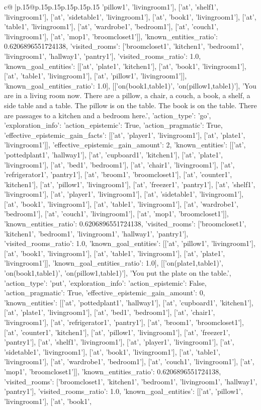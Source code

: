 \documentclass{article}
\begin{document}
{\begin{supertabular}{c@{$\;$}|p{.15\linewidth}@{}p{.15\linewidth}p{.15\linewidth}p{.15\linewidth}p{.15\linewidth}p{.15\linewidth}}
{{{'pillow1', 'livingroom1'], ['at', 'shelf1', 'livingroom1'], ['at', 'sidetable1', 'livingroom1'], ['at', 'book1', 'livingroom1'], ['at', 'table1', 'livingroom1'], ['at', 'wardrobe1', 'bedroom1'], ['at', 'couch1', 'livingroom1'], ['at', 'mop1', 'broomcloset1']], 'known_entities_ratio': 0.6206896551724138, 'visited_rooms': ['broomcloset1', 'kitchen1', 'bedroom1', 'livingroom1', 'hallway1', 'pantry1'], 'visited_rooms_ratio': 1.0, 'known_goal_entities': [['at', 'plate1', 'kitchen1'], ['at', 'book1', 'livingroom1'], ['at', 'table1', 'livingroom1'], ['at', 'pillow1', 'livingroom1']], 'known_goal_entities_ratio': 1.0}}], [['on(book1,table1)', 'on(pillow1,table1)'], 'You are in a living room now. There are a pillow, a chair, a couch, a book, a shelf, a side table and a table. The pillow is on the table. The book is on the table. There are passages to a kitchen and a bedroom here.', {'action_type': 'go', 'exploration_info': {'action_epistemic': True, 'action_pragmatic': True, 'effective_epistemic_gain_facts': [['at', 'player1', 'livingroom1'], ['at', 'plate1', 'livingroom1']], 'effective_epistemic_gain_amount': 2, 'known_entities': [['at', 'pottedplant1', 'hallway1'], ['at', 'cupboard1', 'kitchen1'], ['at', 'plate1', 'livingroom1'], ['at', 'bed1', 'bedroom1'], ['at', 'chair1', 'livingroom1'], ['at', 'refrigerator1', 'pantry1'], ['at', 'broom1', 'broomcloset1'], ['at', 'counter1', 'kitchen1'], ['at', 'pillow1', 'livingroom1'], ['at', 'freezer1', 'pantry1'], ['at', 'shelf1', 'livingroom1'], ['at', 'player1', 'livingroom1'], ['at', 'sidetable1', 'livingroom1'], ['at', 'book1', 'livingroom1'], ['at', 'table1', 'livingroom1'], ['at', 'wardrobe1', 'bedroom1'], ['at', 'couch1', 'livingroom1'], ['at', 'mop1', 'broomcloset1']], 'known_entities_ratio': 0.6206896551724138, 'visited_rooms': ['broomcloset1', 'kitchen1', 'bedroom1', 'livingroom1', 'hallway1', 'pantry1'], 'visited_rooms_ratio': 1.0, 'known_goal_entities': [['at', 'pillow1', 'livingroom1'], ['at', 'book1', 'livingroom1'], ['at', 'table1', 'livingroom1'], ['at', 'plate1', 'livingroom1']], 'known_goal_entities_ratio': 1.0}}], [['on(plate1,table1)', 'on(book1,table1)', 'on(pillow1,table1)'], 'You put the plate on the table.', {'action_type': 'put', 'exploration_info': {'action_epistemic': False, 'action_pragmatic': True, 'effective_epistemic_gain_amount': 0, 'known_entities': [['at', 'pottedplant1', 'hallway1'], ['at', 'cupboard1', 'kitchen1'], ['at', 'plate1', 'livingroom1'], ['at', 'bed1', 'bedroom1'], ['at', 'chair1', 'livingroom1'], ['at', 'refrigerator1', 'pantry1'], ['at', 'broom1', 'broomcloset1'], ['at', 'counter1', 'kitchen1'], ['at', 'pillow1', 'livingroom1'], ['at', 'freezer1', 'pantry1'], ['at', 'shelf1', 'livingroom1'], ['at', 'player1', 'livingroom1'], ['at', 'sidetable1', 'livingroom1'], ['at', 'book1', 'livingroom1'], ['at', 'table1', 'livingroom1'], ['at', 'wardrobe1', 'bedroom1'], ['at', 'couch1', 'livingroom1'], ['at', 'mop1', 'broomcloset1']], 'known_entities_ratio': 0.6206896551724138, 'visited_rooms': ['broomcloset1', 'kitchen1', 'bedroom1', 'livingroom1', 'hallway1', 'pantry1'], 'visited_rooms_ratio': 1.0, 'known_goal_entities': [['at', 'pillow1', 'livingroom1'], ['at', 'book1', }}}
\end{supertabular}}
\end{document}
